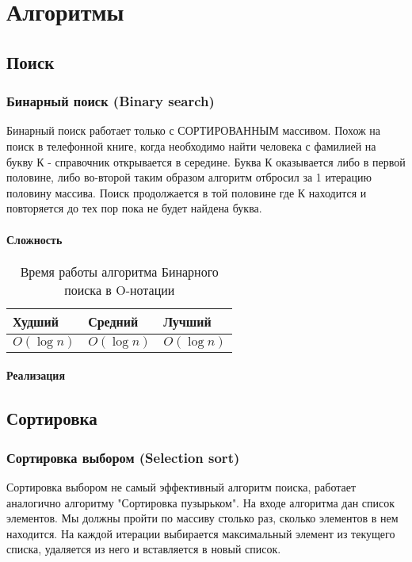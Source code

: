 \chapter{Алгоритмы}

\section{Поиск}
\subsection{Бинарный поиск (Binary search) \label{search:binary}}

Бинарный поиск работает только с СОРТИРОВАННЫМ массивом. Похож на поиск в телефонной книге, когда необходимо найти человека с фамилией на букву К - справочник открывается в середине. Буква К оказывается либо в первой половине, либо во-второй таким образом алгоритм отбросил за 1 итерацию половину массива.
Поиск продолжается в той половине где К находится и повторяется до тех пор пока не будет найдена буква.

\subsubsection{Сложность}
\begin{table}[h!]
\caption{Время работы алгоритма Бинарного поиска в O-нотации}
\begin{tabular}{|l|l|l|}
\hline
Худший & Средний & Лучший \\ \hline
$ O(\log n) $ & $ O(\log n) $ & $ O(\log n) $ \\\hline
\end{tabular}
\end{table}

\subsubsection{Реализация}
\linenumbers
{}
\nolinenumbers	

\section{Сортировка}
\subsection{Сортировка выбором (Selection sort) \label{sort:select}}

Сортировка выбором не самый эффективный алгоритм поиска, работает аналогично алгоритму "Сортировка пузырьком". 
На входе алгоритма дан список элементов. Мы должны пройти по массиву столько раз, сколько элементов в нем находится. На каждой итерации выбирается максимальный элемент из текущего списка, удаляется из него и вставляется в новый список.

